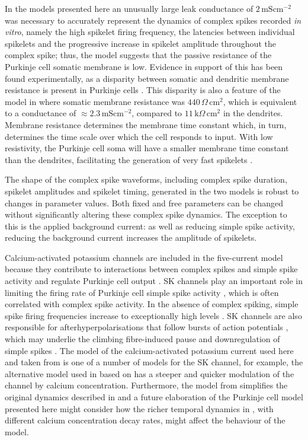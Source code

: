 \documentclass[utf8]{frontiersSCNS} %
\newcommand{\msi}{\,\mathrm{mS cm^{-2}}}
\begin{document}
In the models presented here an unusually large leak conductance of
$2\msi$ was necessary to accurately represent the dynamics of complex
spikes recorded \textit{in vitro}, namely the high spikelet firing
frequency, the latencies between individual spikelets and the
progressive increase in spikelet amplitude throughout the complex
spike; thus, the model suggests that the passive resistance of the
Purkinje cell somatic membrane is low. Evidence in support of this has
been found experimentally, as a disparity between somatic and
dendritic membrane resistance is present in Purkinje cells
\cite{RappEtAl1994}. This disparity is also a feature of the model in
\cite{DeSchutterBower1994a,DeSchutterBower1994b,DeSchutterBower1994c}
where somatic membrane resistance was $440\,\Omega\,\mathrm{cm}^2$,
which is equivalent to a conductance of $\approx 2.3\msi$, compared to
$11\,\mathrm{k}\Omega\,\mathrm{cm}^2$ in the dendrites. Membrane
resistance determines the membrane time constant which, in turn,
determines the time scale over which the cell responds to input. With
low resistivity, the Purkinje cell soma will have a smaller membrane
time constant than the dendrites, facilitating the generation of very
fast spikelets \cite{WarnaarEtAl2015}.

The shape of the complex spike waveforms, including complex spike
duration, spikelet amplitudes and spikelet timing, generated in the
two models is robust to changes in parameter values. Both fixed and
free parameters can be changed without significantly altering these
complex spike dynamics. The exception to this is the applied
background current: as well as reducing simple spike activity,
reducing the background current increases the amplitude of spikelets.

Calcium-activated potassium channels are included in the five-current
model because they contribute to interactions between complex spikes
and simple spike activity and regulate Purkinje cell output
\cite{TankEtAl1988, McKayEtAl2007}. SK channels play an important role
in limiting the firing rate of Purkinje cell simple spike activity
\cite{WomackEtAl2003} \cite{EgorovaEtAl2014}, which is often
correlated with complex spike activity. In the absence of complex
spiking, simple spike firing frequencies increase to exceptionally
high levels \cite{CerminaraRawson2004}. SK channels are also
responsible for afterhyperpolarisations that follow bursts of action
potentials \cite{HosyEtAl2011}, which may underlie the climbing
fibre-induced pause and downregulation of simple spikes
\cite{Xian-HuaEtAl2017}. The model of the calcium-activated potassium
current used here and taken from \cite{GilliesWillshaw2006} is one of
a number of models for the SK channel, for example, the alternative
model used in \cite{GriffithEtAl2016} based on
\cite{ChayKeizer1983,XiaEtAl1998} has a steeper and quicker modulation
of the channel by calcium concentration. Furthermore, the model from
\cite{GilliesWillshaw2006} simplifies the original dynamics described
in \cite{HirschbergEtAl1998} and a future elaboration of the Purkinje
cell model presented here might consider how the richer temporal
dynamics in \cite{HirschbergEtAl1998}, with different calcium
concentration decay rates, might affect the behaviour of the model.
\end{document}
